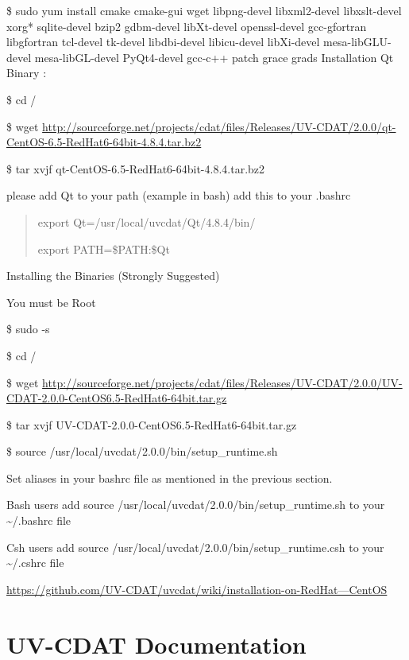 \documentclass[letterpaper,10pt,english]{sphinxmanual}
\begin{document}
\$ sudo yum install cmake cmake-gui wget libpng-devel libxml2-devel libxslt-devel xorg* sqlite-devel bzip2 gdbm-devel libXt-devel openssl-devel gcc-gfortran libgfortran tcl-devel tk-devel libdbi-devel libicu-devel libXi-devel mesa-libGLU-devel mesa-libGL-devel PyQt4-devel gcc-c++ patch grace grads
Installation Qt Binary :

\$ cd /

\$ wget \href{http://sourceforge.net/projects/cdat/files/Releases/UV-CDAT/2.0.0/qt-CentOS-6.5-RedHat6-64bit-4.8.4.tar.bz2}{http://sourceforge.net/projects/cdat/files/Releases/UV-CDAT/2.0.0/qt-CentOS-6.5-RedHat6-64bit-4.8.4.tar.bz2}

\$ tar xvjf qt-CentOS-6.5-RedHat6-64bit-4.8.4.tar.bz2

please add Qt to your path (example in bash) add this to your .bashrc
\begin{quote}

export Qt=/usr/local/uvcdat/Qt/4.8.4/bin/

export PATH=\$PATH:\$Qt
\end{quote}

Installing the Binaries (Strongly Suggested)

You must be Root

\$ sudo -s

\$ cd /

\$ wget \href{http://sourceforge.net/projects/cdat/files/Releases/UV-CDAT/2.0.0/UV-CDAT-2.0.0-CentOS6.5-RedHat6-64bit.tar.gz}{http://sourceforge.net/projects/cdat/files/Releases/UV-CDAT/2.0.0/UV-CDAT-2.0.0-CentOS6.5-RedHat6-64bit.tar.gz}

\$ tar xvjf  UV-CDAT-2.0.0-CentOS6.5-RedHat6-64bit.tar.gz

\$ source /usr/local/uvcdat/2.0.0/bin/setup\_runtime.sh

Set aliases in your bashrc file as mentioned in the previous section.

Bash users add source /usr/local/uvcdat/2.0.0/bin/setup\_runtime.sh to your \textasciitilde{}/.bashrc file

Csh users add source /usr/local/uvcdat/2.0.0/bin/setup\_runtime.csh to your \textasciitilde{}/.cshrc file

\href{https://github.com/UV-CDAT/uvcdat/wiki/installation-on-RedHat---CentOS}{https://github.com/UV-CDAT/uvcdat/wiki/installation-on-RedHat---CentOS}


\section{UV-CDAT Documentation}
\label{getting_started:uv-cdat-documentation}
\end{document}
